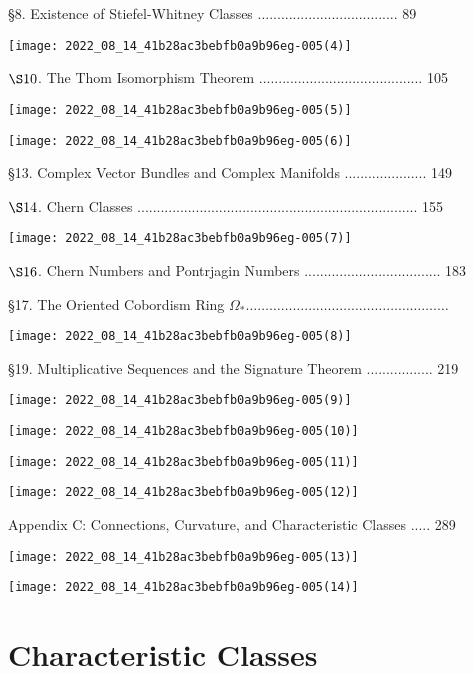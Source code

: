\documentclass[10pt]{article}
\begin{document}
§8. Existence of Stiefel-Whitney Classes .................................... 89

\texttt{[image: 2022\_08\_14\_41b28ac3bebfb0a9b96eg-005(4)]}

$\S 10$. The Thom Isomorphism Theorem .......................................... 105

\texttt{[image: 2022\_08\_14\_41b28ac3bebfb0a9b96eg-005(5)]}

\texttt{[image: 2022\_08\_14\_41b28ac3bebfb0a9b96eg-005(6)]}

§13. Complex Vector Bundles and Complex Manifolds ..................... 149

$\S 14$. Chern Classes ........................................................................ 155

\texttt{[image: 2022\_08\_14\_41b28ac3bebfb0a9b96eg-005(7)]}

$\S 16$. Chern Numbers and Pontrjagin Numbers ................................... 183

§17. The Oriented Cobordism Ring $\Omega_{*} \ldots \ldots \ldots \ldots \ldots \ldots \ldots \ldots \ldots \ldots \ldots \ldots \ldots \ldots \ldots \ldots . \ldots$

\texttt{[image: 2022\_08\_14\_41b28ac3bebfb0a9b96eg-005(8)]}

§19. Multiplicative Sequences and the Signature Theorem ................. 219

\texttt{[image: 2022\_08\_14\_41b28ac3bebfb0a9b96eg-005(9)]}

\texttt{[image: 2022\_08\_14\_41b28ac3bebfb0a9b96eg-005(10)]}

\texttt{[image: 2022\_08\_14\_41b28ac3bebfb0a9b96eg-005(11)]}

\texttt{[image: 2022\_08\_14\_41b28ac3bebfb0a9b96eg-005(12)]}

Appendix C: Connections, Curvature, and Characteristic Classes ..... 289

\texttt{[image: 2022\_08\_14\_41b28ac3bebfb0a9b96eg-005(13)]}

\texttt{[image: 2022\_08\_14\_41b28ac3bebfb0a9b96eg-005(14)]}

\section{Characteristic Classes}
\end{document}
